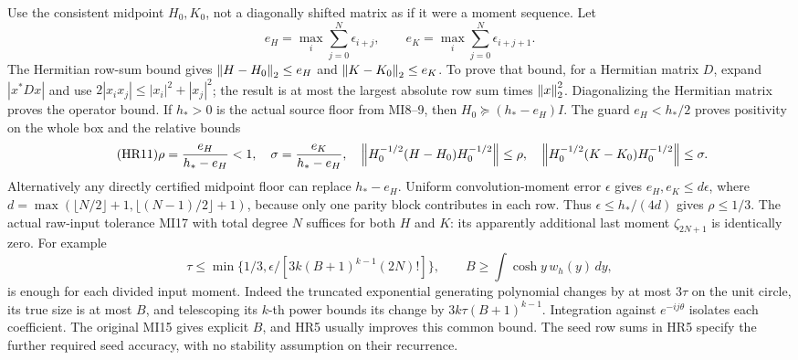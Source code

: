 \documentclass[11pt]{article}
\begin{document}
Use the consistent midpoint \(H_0,K_0\), not a diagonally shifted
matrix as if it were a moment sequence. Let
\begin{equation}\tag{HR10}\label{hrv:HR10}
e_H=\max_i\sum_{j=0}^N\epsilon_{i+j},\qquad
e_K=\max_i\sum_{j=0}^N\epsilon_{i+j+1}.
\end{equation}
The Hermitian row-sum bound gives \(\left\lVert H-H_0\right\rVert_2\le e_H\) and
\(\left\lVert K-K_0\right\rVert_2\le e_K\). To prove that bound, for a Hermitian
matrix \(D\), expand \(|x^*Dx|\) and use
\(2|x_i x_j|\le|x_i|^2+|x_j|^2\); the result is at most the
largest absolute row sum times \(\left\lVert x\right\rVert_2^2\). Diagonalizing the
Hermitian matrix proves the operator bound.
If \(h_*>0\) is the actual source floor from MI8--9, then
\(H_0\succeq(h_*-e_H)I\). The guard \(e_H<h_*/2\) proves positivity
on the whole box and the relative bounds
\begin{equation}\tag{HR11}\label{hrv:HR11}
\rho=\frac{e_H}{h_*-e_H}<1,\quad
\sigma=\frac{e_K}{h_*-e_H},\quad
\left\lVert H_0^{-1/2}(H-H_0)H_0^{-1/2}\right\rVert\le\rho,\quad
\left\lVert H_0^{-1/2}(K-K_0)H_0^{-1/2}\right\rVert\le\sigma.
\end{equation}
Alternatively any directly certified midpoint floor can replace
\(h_*-e_H\). Uniform convolution-moment error \(\epsilon\) gives
\(e_H,e_K\le d\epsilon\), where
\(d=\max(\lfloor N/2\rfloor+1,\lfloor(N-1)/2\rfloor+1)\), because
only one parity block contributes in each row. Thus
\(\epsilon\le h_*/(4d)\) gives \(\rho\le1/3\).
The actual raw-input tolerance MI17 with total degree \(N\) suffices
for both \(H\) and \(K\): its apparently additional last moment
\(\zeta_{2N+1}\) is identically zero. For example
\begin{equation}\tag{HR12}\label{hrv:HR12}
\tau\le\min\{1/3,\epsilon/[3k(B+1)^{k-1}(2N)!]\},\qquad
B\ge\int\cosh y\,w_h(y)\,dy,
\end{equation}
is enough for each divided input moment. Indeed the truncated
exponential generating polynomial changes by at most \(3\tau\) on
the unit circle, its true size is at most \(B\), and telescoping
its \(k\)-th power bounds its change by \(3k\tau(B+1)^{k-1}\).
Integration against \(e^{-ij\theta}\) isolates each coefficient.
The original MI15 gives explicit \(B\), and HR5 usually improves this
common bound. The seed row sums in HR5 specify the further required
seed accuracy, with no stability assumption on their recurrence.
\end{document}
